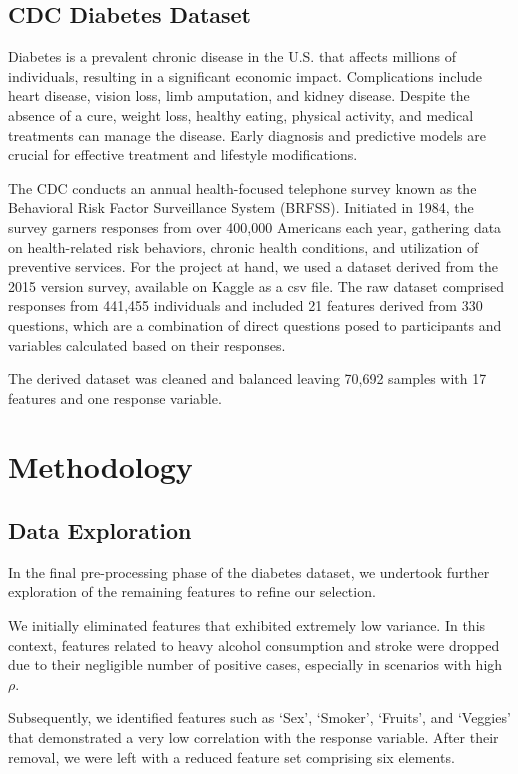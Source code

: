 \documentclass[journal]{IEEEtran}
\begin{document}
	\subsection{CDC Diabetes Dataset}
	\cite{cdc2022}
	Diabetes is a prevalent chronic disease in the U.S. that affects millions of individuals, resulting in a significant economic impact. Complications include heart disease, vision loss, limb amputation, and kidney disease. Despite the absence of a cure, weight loss, healthy eating, physical activity, and medical treatments can manage the disease. Early diagnosis and predictive models are crucial for effective treatment and lifestyle modifications.
	
	The CDC conducts an annual health-focused telephone survey known as the Behavioral Risk Factor Surveillance System (BRFSS). Initiated in 1984, the survey garners responses from over 400,000 Americans each year, gathering data on health-related risk behaviors, chronic health conditions, and utilization of preventive services. For the project at hand, we used a dataset derived from the 2015 version survey, available on Kaggle as a csv file. The raw dataset comprised responses from 441,455 individuals and included 21 features derived from 330 questions, which are a combination of direct questions posed to participants and variables calculated based on their responses.

	The derived dataset was cleaned and balanced leaving 70,692 samples with 17 features and one response variable. 
	
	
	\section{Methodology}
	\label{sec:methodology}
	
	\subsection{Data Exploration}
	
	In the final pre-processing phase of the diabetes dataset, we undertook further exploration of the remaining features to refine our selection.
	
	We initially eliminated features that exhibited extremely low variance. In this context, features related to heavy alcohol consumption and stroke were dropped due to their negligible number of positive cases, especially in scenarios with high $\rho$.
	
	Subsequently, we identified features such as `Sex', `Smoker', `Fruits', and `Veggies' that demonstrated a very low correlation with the response variable. After their removal, we were left with a reduced feature set comprising six elements.
	
\end{document}
